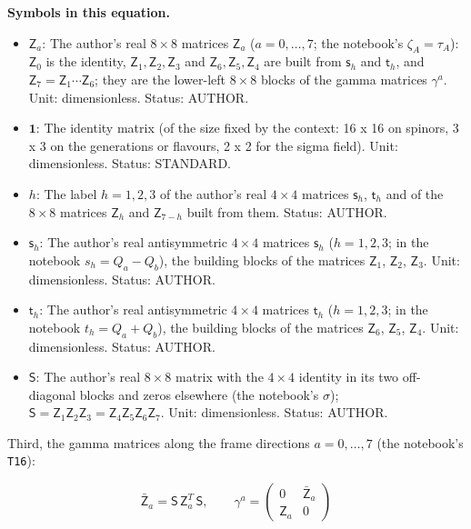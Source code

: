 \documentclass[
  10pt,
]{article}
\providecommand{\tightlist}{%
  \setlength{\itemsep}{0pt}\setlength{\parskip}{0pt}}
\begin{document}
\textbf{Symbols in this equation.}

\begin{itemize}
\tightlist
\item
  \(\mathsf{Z}_a\): The author's real \(8\times8\) matrices
  \(\mathsf{Z}_a\) (\(a = 0, \dots, 7\); the notebook's
  \(\zeta_A = \tau_A\)): \(\mathsf{Z}_0\) is the identity,
  \(\mathsf{Z}_1, \mathsf{Z}_2, \mathsf{Z}_3\) and
  \(\mathsf{Z}_6, \mathsf{Z}_5, \mathsf{Z}_4\) are built from
  \(\mathsf{s}_h\) and \(\mathsf{t}_h\), and
  \(\mathsf{Z}_7 = \mathsf{Z}_1\cdots\mathsf{Z}_6\); they are the
  lower-left \(8\times8\) blocks of the gamma matrices \(\gamma^a\).
  Unit: dimensionless. Status: AUTHOR.
\item
  \(\mathbf{1}\): The identity matrix (of the size fixed by the context:
  16 x 16 on spinors, 3 x 3 on the generations or flavours, 2 x 2 for
  the sigma field). Unit: dimensionless. Status: STANDARD.
\item
  \(h\): The label \(h = 1, 2, 3\) of the author's real \(4\times4\)
  matrices \(\mathsf{s}_h\), \(\mathsf{t}_h\) and of the \(8\times8\)
  matrices \(\mathsf{Z}_h\) and \(\mathsf{Z}_{7-h}\) built from them.
  Status: AUTHOR.
\item
  \(\mathsf{s}_h\): The author's real antisymmetric \(4\times4\)
  matrices \(\mathsf{s}_h\) (\(h = 1, 2, 3\); in the notebook
  \(s_h = Q_a - Q_b\)), the building blocks of the matrices
  \(\mathsf{Z}_1\), \(\mathsf{Z}_2\), \(\mathsf{Z}_3\). Unit:
  dimensionless. Status: AUTHOR.
\item
  \(\mathsf{t}_h\): The author's real antisymmetric \(4\times4\)
  matrices \(\mathsf{t}_h\) (\(h = 1, 2, 3\); in the notebook
  \(t_h = Q_a + Q_b\)), the building blocks of the matrices
  \(\mathsf{Z}_6\), \(\mathsf{Z}_5\), \(\mathsf{Z}_4\). Unit:
  dimensionless. Status: AUTHOR.
\item
  \(\mathsf{S}\): The author's real \(8\times8\) matrix with the
  \(4\times4\) identity in its two off-diagonal blocks and zeros
  elsewhere (the notebook's \(\sigma\));
  \(\mathsf{S} = \mathsf{Z}_1\mathsf{Z}_2\mathsf{Z}_3 = \mathsf{Z}_4\mathsf{Z}_5\mathsf{Z}_6\mathsf{Z}_7\).
  Unit: dimensionless. Status: AUTHOR.
\end{itemize}

Third, the gamma matrices along the frame directions \(a = 0, \dots, 7\)
(the notebook's \texttt{T16}):

\[
\bar{\mathsf{Z}}_a = \mathsf{S}\,\mathsf{Z}_a^T\,\mathsf{S},\qquad
\gamma^a = \begin{pmatrix}0 & \bar{\mathsf{Z}}_a\\ \mathsf{Z}_a & 0\end{pmatrix}
\]
\end{document}
